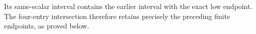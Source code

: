 Its same-scalar interval contains the earlier interval with
the exact low endpoint. The four-entry intersection therefore
retains precisely the preceding finite endpoints, as proved below.